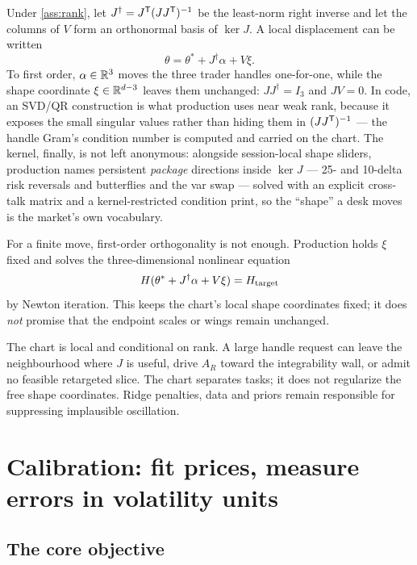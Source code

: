 \documentclass[11pt]{article}
\begin{document}
Under \cref{ass:rank}, let $J^\dagger=J^{\mathsf{T}}(JJ^{\mathsf{T}})^{-1}$ be the least-norm right
inverse and let the columns of $V$ form an orthonormal basis of $\ker J$.  A
local displacement can be written
\begin{equation}
\theta=\theta^*+J^\dagger\alpha+V\xi.
\label{eq:chart}
\end{equation}
To first order, $\alpha\in\mathbb{R}^3$ moves the three trader handles one-for-one,
while the shape coordinate $\xi\in\mathbb{R}^{d-3}$ leaves them unchanged:
$J J^\dagger=I_3$ and $JV=0$.  In code, an SVD/QR construction is what
production uses near weak rank, because it exposes the small singular values
rather than hiding them in $(JJ^{\mathsf{T}})^{-1}$ --- the handle Gram's condition
number is computed and carried on the chart.  The kernel, finally, is not
left anonymous: alongside session-local shape sliders, production names
persistent \emph{package} directions inside $\ker J$ --- 25- and 10-delta
risk reversals and butterflies and the var swap --- solved with an explicit
cross-talk matrix and a kernel-restricted condition print, so the
``shape'' a desk moves is the market's own vocabulary.

For a finite move, first-order orthogonality is not enough.  Production holds
$\xi$ fixed and solves the three-dimensional nonlinear equation
\begin{equation}
H(\theta^*+J^\dagger\alpha+V\xi)=H_{\rm target}
\label{eq:retarget}
\end{equation}
by Newton iteration.  This keeps the chart's local shape coordinates fixed; it
does \emph{not} promise that the endpoint scales or wings remain unchanged.

\begin{caution}
The chart is local and conditional on rank.  A large handle request can leave
the neighbourhood where $J$ is useful, drive $A_R$ toward the integrability
wall, or admit no feasible retargeted slice.  The chart separates tasks; it
does not regularize the free shape coordinates.  Ridge penalties, data and
priors remain responsible for suppressing implausible oscillation.
\end{caution}

\section{Calibration: fit prices, measure errors in volatility units}
\label{sec:calibration}

\subsection{The core objective}
\end{document}
